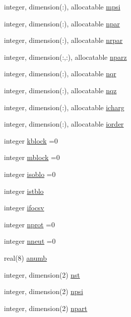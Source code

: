 \begin{DoxyCompactItemize}
integer, dimension(\+:), allocatable \hyperlink{namespacelevels_a465336b1dc5b723d1f54fb7361d8ed38}{mpsi}
\item 
integer, dimension(\+:), allocatable \hyperlink{namespacelevels_a452a8212f6b718ac0f5e0809ca874e67}{npar}
\item 
integer, dimension(\+:), allocatable \hyperlink{namespacelevels_a2c9b0cdf673a4c98cbe3f5742545e4b9}{nrpar}
\item 
integer, dimension(\+:,\+:), allocatable \hyperlink{namespacelevels_a38ed4d213572f2840bd1bce5a2ec886a}{nparz}
\item 
integer, dimension(\+:), allocatable \hyperlink{namespacelevels_a3a3fdd724fc4182517f3e6b94cd503ed}{nqr}
\item 
integer, dimension(\+:), allocatable \hyperlink{namespacelevels_a7477bf7a01308e1450bd9b8b0a7b3b05}{nqz}
\item 
integer, dimension(\+:), allocatable \hyperlink{namespacelevels_a6ed487575af304e88ec872c32a7cff19}{icharg}
\item 
integer, dimension(\+:), allocatable \hyperlink{namespacelevels_a3b749ab6a1c4ad37dad493d3d91d7e04}{iorder}
\item 
integer \hyperlink{namespacelevels_a4f8198007cbc95b2fb23ebf1d1f1c118}{kblock} =0
\item 
integer \hyperlink{namespacelevels_a4ccc9103e54f31bb0cab356aa6beddb1}{mblock} =0
\item 
integer \hyperlink{namespacelevels_ae193d65da90e45d3e2d7238422a5bfba}{isoblo} =0
\item 
integer \hyperlink{namespacelevels_ad997f1af1ed619df7972aea27654aed0}{istblo}
\item 
integer \hyperlink{namespacelevels_a7f6a832a14f8ccf0a880e041c9d9f166}{ifocsv}
\item 
integer \hyperlink{namespacelevels_a07af295449db01b659290e9192db954f}{nprot} =0
\item 
integer \hyperlink{namespacelevels_aa35279701a4ecc295c042671aa8ecceb}{nneut} =0
\item 
real(8) \hyperlink{namespacelevels_a4d77a3334351c433fabe9af667519fab}{anumb}
\item 
integer, dimension(2) \hyperlink{namespacelevels_ab8eb028f61bdfcc376968b23bacdb68f}{nst}
\item 
integer, dimension(2) \hyperlink{namespacelevels_aa9870c52b50461dd864875bf5572da11}{npsi}
\item 
integer, dimension(2) \hyperlink{namespacelevels_ac7fcd5c6719ad0864f89f22dcb0e60f0}{npart}

\end{DoxyCompactItemize}
